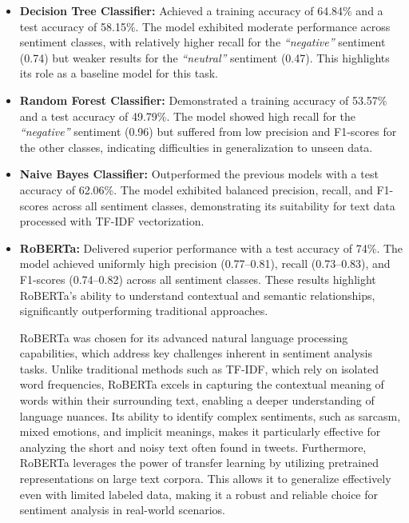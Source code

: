 \documentclass[journal]{IEEEtran}
\begin{document}
\begin{itemize}
    \item \textbf{Decision Tree Classifier:} Achieved a training accuracy of 64.84\% and a test accuracy of 58.15\%. The model exhibited moderate performance across sentiment classes, with relatively higher recall for the \textit{“negative”} sentiment (0.74) but weaker results for the \textit{“neutral”} sentiment (0.47). This highlights its role as a baseline model for this task.
    
    \item \textbf{Random Forest Classifier:} Demonstrated a training accuracy of 53.57\% and a test accuracy of 49.79\%. The model showed high recall for the \textit{“negative”} sentiment (0.96) but suffered from low precision and F1-scores for the other classes, indicating difficulties in generalization to unseen data.
    
    \item \textbf{Naive Bayes Classifier:} Outperformed the previous models with a test accuracy of 62.06\%. The model exhibited balanced precision, recall, and F1-scores across all sentiment classes, demonstrating its suitability for text data processed with TF-IDF vectorization.
    
    \item \textbf{RoBERTa:} Delivered superior performance with a test accuracy of 74\%. The model achieved uniformly high precision (0.77–0.81), recall (0.73–0.83), and F1-scores (0.74–0.82) across all sentiment classes. These results highlight RoBERTa’s ability to understand contextual and semantic relationships, significantly outperforming traditional approaches. 
    
    RoBERTa was chosen for its advanced natural language processing capabilities, which address key challenges inherent in sentiment analysis tasks. Unlike traditional methods such as TF-IDF, which rely on isolated word frequencies, RoBERTa excels in capturing the contextual meaning of words within their surrounding text, enabling a deeper understanding of language nuances. Its ability to identify complex sentiments, such as sarcasm, mixed emotions, and implicit meanings, makes it particularly effective for analyzing the short and noisy text often found in tweets. Furthermore, RoBERTa leverages the power of transfer learning by utilizing pretrained representations on large text corpora. This allows it to generalize effectively even with limited labeled data, making it a robust and reliable choice for sentiment analysis in real-world scenarios.
\end{itemize}
\end{document}
